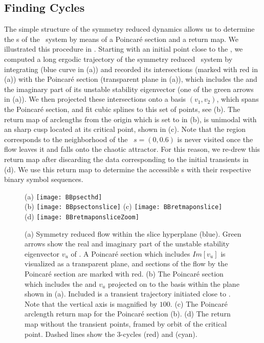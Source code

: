 \subsection{Finding Cycles}

The simple structure of the symmetry reduced dynamics allows us to determine the 
\rpo s of the \twomode\ system by means of a Poincar\'e section and a return map. We illustrated this procedure in . Starting with an initial
point close to the \REQV{}{}, we computed a long ergodic trajectory of the symmetry reduced \twomode\ system by integrating  (blue curve in  (a)) and recorded its intersections (marked with red in  (a)) with the Poincar\'e section (transparent plane in  (a)), which includes the \REQV{}{} and the imaginary part of its unstable stability eigenvector (one of the green arrows in  (a)). We then projected these intersections onto a
basis $(v_1, v_2)$, which spans the Poincar\'e section, and fit cubic splines to this set of points, see  (b). The return map of arclengths from the origin which is set to \REQV{}{} in  (b), is unimodal with an sharp cusp located at its critical point, shown in  (c). Note that the region corresponds to the neighborhood of the \reqv\ $s = (0, 0.6)$ is never visited once the flow leaves it and falls onto the chaotic attractor. For this reason, we re-drew this return map after discarding the data corresponding to the initial transients in  (d). We use this return map to determine the accessible \rpo s  with their respective binary symbol sequences.

\begin{figure}
\centering
  (a) \texttt{[image: BBpsecthd]} \\
  (b) \texttt{[image: BBpsectonslice]}
  (c) \texttt{[image: BBretmaponslice]} \\
  (d) \texttt{[image: BBretmaponsliceZoom]}
\caption{(a) Symmetry reduced flow within the slice hyperplane (blue).
			Green arrows show the real and imaginary part of the unstable stability
			eigenvector $v_u$ of \REQV{}{}. A Poincar\'e section which includes
			$Im[v_u]$ is visualized as a transparent plane, and sections
			of the flow by the Poincar\'e section are marked with red.
		 (b) The Poincar\'e section which includes the \REQV{}{} and $v_u$ projected
			on to the basis within the plane shown in (a). Included is a
            transient trajectory initiated close to \REQV{}{}. Note that
		  	the vertical axis is magnified by $100$.
		 (c) The Poincar\'e arclength return map for the
		    Poincar\'e section (b).
		 (d) The return map without the transient points, framed by
            orbit of the critical point.
		 	Dashed lines show the 3-cycles  (red) and  (cyan).}
\label{fig:psectandretmap}
\end{figure}

